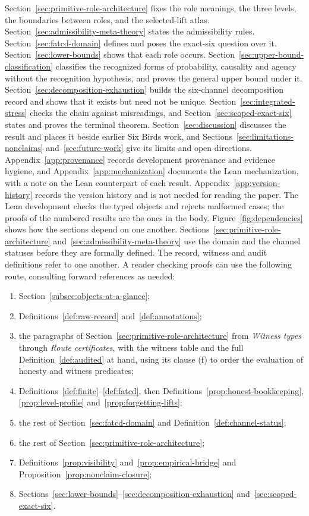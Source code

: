 Section~\ref{sec:primitive-role-architecture} fixes the role meanings,
the three levels, the boundaries between roles, and the selected-lift
atlas. Section~\ref{sec:admissibility-meta-theory} states the
admissibility rules. Section~\ref{sec:fatcd-domain} defines \FATCD{} and
poses the exact-six question over it. Section~\ref{sec:lower-bounds}
shows that each role occurs. Section~\ref{sec:upper-bound-classification}
classifies the recognized forms of probability, causality and agency
without the recognition hypothesis, and proves the general upper bound
under it.
Section~\ref{sec:decomposition-exhaustion} builds the six-channel
decomposition record and shows that it exists but need not be unique.
Section~\ref{sec:integrated-stress} checks the chain against misreadings,
and Section~\ref{sec:scoped-exact-six} states and proves the terminal
theorem. Section~\ref{sec:discussion} discusses the result and places it
beside earlier Six Birds work, and Sections~\ref{sec:limitations-nonclaims}
and~\ref{sec:future-work} give its limits and open directions. Appendix~\ref{app:provenance} records development provenance and
evidence hygiene, and Appendix~\ref{app:mechanization} documents the
Lean mechanization, with a note on the Lean counterpart of each result. Appendix~\ref{app:version-history} records the version history and is not needed for reading the paper. The Lean development checks the typed objects and rejects
malformed cases; the proofs of the numbered results are the ones in the body.
Figure~\ref{fig:dependencies} shows how the sections depend on one another.
Sections~\ref{sec:primitive-role-architecture}
and~\ref{sec:admissibility-meta-theory} use the domain \FATCD{} and the
channel statuses before they are formally defined. The record, witness and audit definitions refer to one another. A reader
checking proofs can use the following route, consulting forward references
as needed:
\begin{enumerate}[label=(\arabic*),topsep=2pt,itemsep=1pt]
  \item Section~\ref{subsec:objects-at-a-glance};
  \item Definitions~\ref{def:raw-record} and~\ref{def:annotations};
  \item the paragraphs of Section~\ref{sec:primitive-role-architecture} from
    \emph{Witness types} through \emph{Route certificates}, with the witness
    table and the full Definition~\ref{def:audited} at hand, using its clause
    (f) to order the evaluation of honesty and witness predicates;
  \item Definitions~\ref{def:finite}--\ref{def:fatcd}, then
    Definitions~\ref{prop:honest-bookkeeping}, \ref{prop:level-profile}
    and~\ref{prop:forgetting-lifts};
  \item the rest of Section~\ref{sec:fatcd-domain} and
    Definition~\ref{def:channel-status};
  \item the rest of Section~\ref{sec:primitive-role-architecture};
  \item Definitions~\ref{prop:visibility} and~\ref{prop:empirical-bridge} and
    Proposition~\ref{prop:nonclaim-closure};
  \item Sections~\ref{sec:lower-bounds}--\ref{sec:decomposition-exhaustion}
    and~\ref{sec:scoped-exact-six}.
\end{enumerate}
